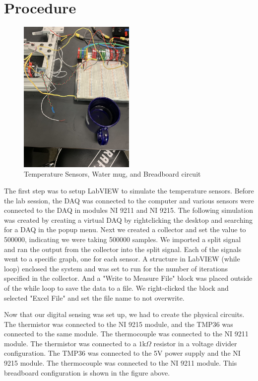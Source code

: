 \documentclass{article}
\begin{document}
\section{Procedure}
\begin{figure}[H]
\centering
\includegraphics[width=0.5\textwidth, angle = -90]{lab2images/circuit_board_mug_and_sensors.jpg}
\caption{Temperature Sensors, Water mug, and Breadboard circuit}
\end{figure}

The first step was to setup LabVIEW to simulate the temperature sensors. Before the lab session, the DAQ was connected to the computer and various sensors were connected to the DAQ in modules NI 9211 and NI 9215. The following simulation was created by creating a virtual DAQ by rightclicking the desktop and searching for a DAQ in the popup menu. Next we created a collector and set the value to 500000, indicating we were taking 500000 samples. We imported a split signal and ran the output from the collector into the split signal. Each of the signals went to a specific graph, one for each sensor. A structure in LabVIEW (while loop) enclosed the system and was set to run for the number of iterations specified in the collector. And a "Write to Measure File" block was placed outside of the while loop to save the data to a file. We right-clicked the block and selected "Excel File" and set the file name to not overwrite.

Now that our digital sensing was set up, we had to create the physical circuits. The thermistor was connected to the NI 9215 module, and the TMP36 was connected to the same module. The thermocouple was connected to the NI 9211 module. The thermistor was connected to a $1\text{k}\Omega$ resistor in a voltage divider configuration. The TMP36 was connected to the 5V power supply and the NI 9215 module. The thermocouple was connected to the NI 9211 module. This breadboard configuration is shown in the figure above.
\end{document}

